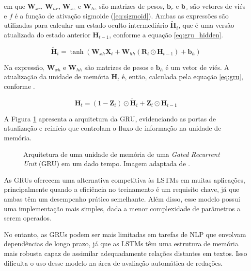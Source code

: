 em que $\boldsymbol{W}_{xr}$, $\boldsymbol{W}_{hr}$, $\boldsymbol{W}_{xz}$ e $\boldsymbol{W}_{hz}$ são matrizes de pesos, $\boldsymbol{b}_{r}$ e $\boldsymbol{b}_{z}$ são vetores de viés e $f$ é a função de ativação sigmoide (\ref{eq:sigmoid}). Ambas as expressões são utilizadas para calcular um estado oculto intermediário $\tilde{\boldsymbol{H}}_{t}$, que é uma versão atualizada do estado anterior $\boldsymbol{H}_{t-1}$, conforme a equação \ref{eq:gru_hidden}.

\begin{equation}
    \label{eq:gru_hidden}
    \tilde{\boldsymbol{H}}_{t} = \tanh \left( \boldsymbol{W}_{xh} \boldsymbol{X}_{t} + \boldsymbol{W}_{hh} (\boldsymbol{R}_{t} \odot \boldsymbol{H}_{t-1}) + \boldsymbol{b}_{h} \right)
\end{equation}

Na expressão, $\boldsymbol{W}_{xh}$ e $\boldsymbol{W}_{hh}$ são matrizes de pesos e $\boldsymbol{b}_{h}$ é um vetor de viés. A atualização da unidade de memória $\boldsymbol{H}_{t}$ é, então, calculada pela equação \ref{eq:gru}, conforme \citet{zhang2023dive}.

\begin{equation}
    \label{eq:gru}
    \boldsymbol{H}_{t} = (1 - \boldsymbol{Z}_{t}) \odot \tilde{\boldsymbol{H}}_{t} + \boldsymbol{Z}_{t} \odot \boldsymbol{H}_{t-1}
\end{equation}

A Figura \ref{fig:gru_architecture} apresenta a arquitetura da GRU, evidenciando as portas de atualização e reinício que controlam o fluxo de informação na unidade de memória.

\begin{figure}[H]
    \centering
    \caption{Arquitetura de uma unidade de memória de uma \textit{Gated Recurrent Unit} (GRU) em um dado tempo. Imagem adaptada de \cite{zhang2023dive}.}
    \label{fig:gru_architecture}
    
\end{figure}

As GRUs oferecem uma alternativa competitiva às LSTMs em muitas aplicações, principalmente quando a eficiência no treinamento é um requisito chave, já que ambas têm um desempenho prático semelhante. Além disso, esse modelo possui uma implementação mais simples, dada a menor complexidade de parâmetros a serem operados.

No entanto, as GRUs podem ser mais limitadas em tarefas de NLP que envolvam dependências de longo prazo, já que as LSTMs têm uma estrutura de memória mais robusta capaz de assimilar adequadamente relações distantes em textos. Isso dificulta o uso desse modelo na área de avaliação automática de redações.

